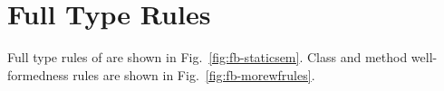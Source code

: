 \section{Full Type Rules}




Full type rules of \FB are shown in Fig.~\ref{fig:fb-staticsem}. Class
and method well-formedness rules are shown in
Fig.~\ref{fig:fb-morewfrules}.


